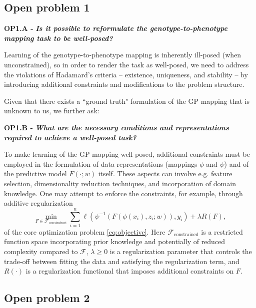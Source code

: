 \documentclass[12pt]{article}
\begin{document}

\subsection{Open problem 1}\label{sec:OP1}

\textbf{OP1.A - }\textbf{\textit{Is it possible to reformulate the genotype-to-phenotype mapping task to be well-posed?}}

Learning of the genotype-to-phenotype mapping is inherently ill-posed (when unconstrained), so in order to render the task as well-posed, we need to address the violations of Hadamard's criteria -- existence, uniqueness, and stability -- by introducing additional constraints and modifications to the problem structure.

Given that there exists a ``ground truth" formulation of the GP mapping that is unknown to us, we further ask:

\textbf{OP1.B - }\textbf{\textit{What are the necessary conditions and representations required to achieve a well-posed task?}}

To make learning of the GP mapping well-posed, additional constraints must be employed in the formulation of data representations (mappings $\phi$ and $\psi$) and of the predictive model $F(\cdot; w)$ itself. These aspects can involve e.g. feature selection, dimensionality reduction techniques, and incorporation of domain knowledge. 
One may attempt to enforce the constraints, for example, through additive regularization
%
\begin{equation}
\label{eq:OP1-objective}
\min_{F \in \mathcal{F}_{\text{constrained}}} \sum_{i=1}^n \ell(\psi^{-1}(F(\phi(x_i),z_i; w)),y_i) + \lambda R(F),
\end{equation}
of the core optimization problem \eqref{eq:objective}. Here $\mathcal{F}_{\text{constrained}}$ is a restricted function space incorporating prior knowledge and potentially of reduced complexity compared to $\mathcal{F}$, $\lambda \geq 0$ is a regularization parameter that controls the trade-off between fitting the data and satisfying the regularization term, and $R(\cdot)$ is a regularization functional that imposes additional constraints on $F$.


\subsection{Open problem 2}\label{sec:OP2}
\end{document}
